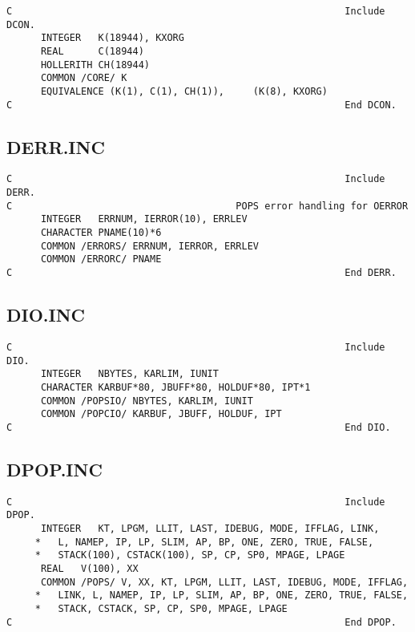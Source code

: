 \begin{verbatim}
C                                                          Include DCON.
      INTEGER   K(18944), KXORG
      REAL      C(18944)
      HOLLERITH CH(18944)
      COMMON /CORE/ K
      EQUIVALENCE (K(1), C(1), CH(1)),     (K(8), KXORG)
C                                                          End DCON.

\end{verbatim}
\subsection{DERR.INC}

\begin{verbatim}
C                                                          Include DERR.
C                                       POPS error handling for OERROR
      INTEGER   ERRNUM, IERROR(10), ERRLEV
      CHARACTER PNAME(10)*6
      COMMON /ERRORS/ ERRNUM, IERROR, ERRLEV
      COMMON /ERRORC/ PNAME
C                                                          End DERR.

\end{verbatim}
\subsection{DIO.INC}

\begin{verbatim}
C                                                          Include DIO.
      INTEGER   NBYTES, KARLIM, IUNIT
      CHARACTER KARBUF*80, JBUFF*80, HOLDUF*80, IPT*1
      COMMON /POPSIO/ NBYTES, KARLIM, IUNIT
      COMMON /POPCIO/ KARBUF, JBUFF, HOLDUF, IPT
C                                                          End DIO.

\end{verbatim}
\subsection{DPOP.INC}

\begin{verbatim}
C                                                          Include DPOP.
      INTEGER   KT, LPGM, LLIT, LAST, IDEBUG, MODE, IFFLAG, LINK,
     *   L, NAMEP, IP, LP, SLIM, AP, BP, ONE, ZERO, TRUE, FALSE,
     *   STACK(100), CSTACK(100), SP, CP, SP0, MPAGE, LPAGE
      REAL   V(100), XX
      COMMON /POPS/ V, XX, KT, LPGM, LLIT, LAST, IDEBUG, MODE, IFFLAG,
     *   LINK, L, NAMEP, IP, LP, SLIM, AP, BP, ONE, ZERO, TRUE, FALSE,
     *   STACK, CSTACK, SP, CP, SP0, MPAGE, LPAGE
C                                                          End DPOP.

\end{verbatim}
